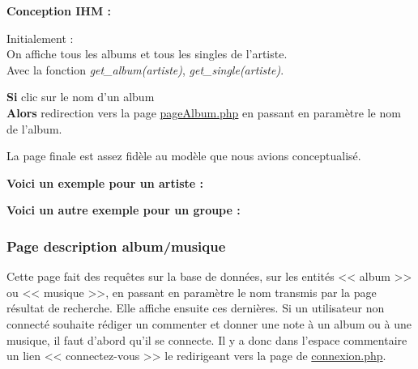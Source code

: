 			\begin{paragraphe}
				\textbf{Conception IHM :}
			\end{paragraphe}

			\begin{paragraphe}
				Initialement : \\
				On affiche tous les albums et tous les singles de l'artiste. \\
				Avec la fonction \emph{get\_album(artiste)}, \emph{get\_single(artiste)}.
			\end{paragraphe}

			\begin{paragraphe}
				\textbf{Si} clic sur le nom d'un album \\
				\textbf{Alors} redirection vers la page \underline{pageAlbum.php} en passant en paramètre le nom de l'album.
			\end{paragraphe}


         \newpage

            \begin{paragraphe}
                La page finale est assez fidèle au modèle que nous avions conceptualisé.
            \end{paragraphe}

            \begin{paragraphe}
                \textbf{Voici un exemple pour un artiste :}
            \end{paragraphe}
            

            \begin{paragraphe}
                \textbf{Voici un autre exemple pour un groupe :}
            \end{paragraphe}
            

        \clearpage

		\subsubsection{Page description album/musique}

			\begin{paragraphe}
                Cette page fait des requêtes sur la base de données, sur les entités << album >> ou << musique >>,
                 en passant en paramètre le nom transmis par la page résultat de recherche. Elle affiche ensuite ces dernières.
				Si un utilisateur non connecté souhaite rédiger un commenter et donner une note à un album ou à une musique,
				 il faut d'abord qu'il se connecte. Il y a donc dans l'espace commentaire un lien << connectez-vous >> le redirigeant vers la page de \underline{connexion.php}.
			\end{paragraphe}


